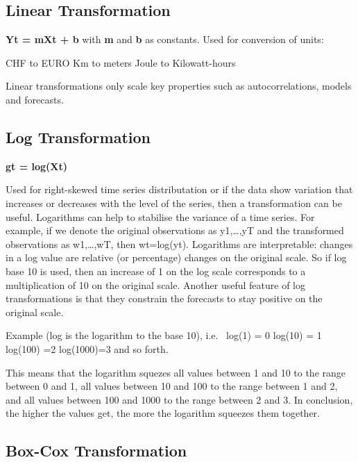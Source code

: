 \documentclass[
]{article}
\begin{document}
\hypertarget{linear-transformation}{%
\subsection{Linear Transformation}\label{linear-transformation}}

\textbf{Yt = mXt + b} with \textbf{m} and \textbf{b} as constants. Used
for conversion of units:

CHF to EURO Km to meters Joule to Kilowatt-hours

Linear transformations only scale key properties such as
autocorrelations, models and forecasts.

\hypertarget{log-transformation}{%
\subsection{Log Transformation}\label{log-transformation}}

\textbf{gt = log(Xt)}

Used for right-skewed time series distributation or if the data show
variation that increases or decreases with the level of the series, then
a transformation can be useful. Logarithms can help to stabilise the
variance of a time series. For example, if we denote the original
observations as y1,\ldots,yT and the transformed observations as
w1,\ldots,wT, then wt=log(yt). Logarithms are interpretable: changes in
a log value are relative (or percentage) changes on the original scale.
So if log base 10 is used, then an increase of 1 on the log scale
corresponds to a multiplication of 10 on the original scale. Another
useful feature of log transformations is that they constrain the
forecasts to stay positive on the original scale.

Example (log is the logarithm to the base 10), i.e.~ log(1) = 0 log(10)
= 1 log(100) =2 log(1000)=3 and so forth.

This means that the logarithm squezes all values between 1 and 10 to the
range between 0 and 1, all values between 10 and 100 to the range
between 1 and 2, and all values between 100 and 1000 to the range
between 2 and 3. In conclusion, the higher the values get, the more the
logarithm squeezes them together.

\hypertarget{box-cox-transformation}{%
\subsection{Box-Cox Transformation}\label{box-cox-transformation}}
\end{document}
